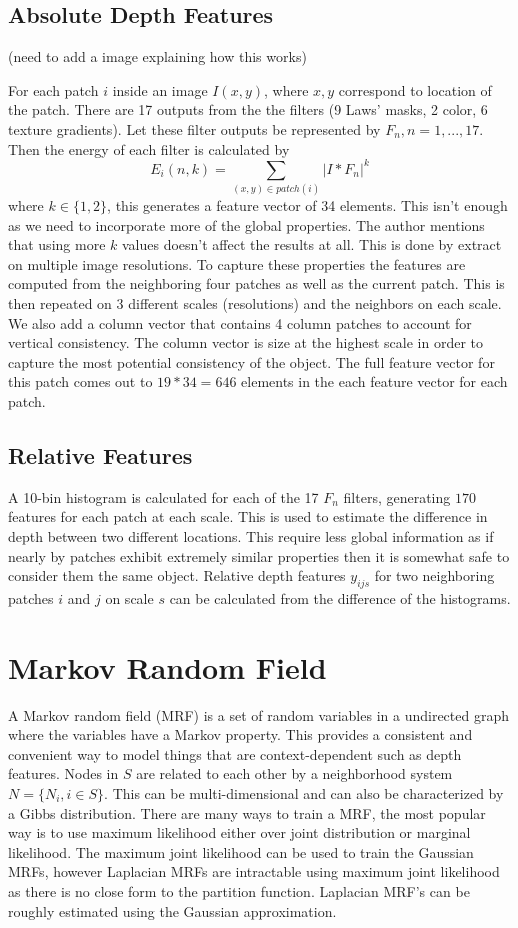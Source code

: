 \documentclass[journal]{IEEEtran}
\begin{document}
\subsection{Absolute Depth Features}
(need to add a image explaining how this works)

For each patch $i$ inside an image $I(x, y)$, where $x, y$ correspond to location of the patch. There are 17 outputs from the the filters (9 Laws' masks, 2 color, 6 texture gradients). Let these filter outputs be represented by $F_n, n = 1,..., 17$. Then the energy of each filter is calculated by
\begin{equation}
E_i(n, k) = \sum_{(x, y) \in patch(i)} |I * F_n|^k
\end{equation}
where $k \in \{1, 2\}$, this generates a feature vector of 34 elements.
This isn't enough as we need to incorporate more of the global properties. The author mentions that using more $k$ values doesn't affect the results at all. This is done by extract on multiple image resolutions. To capture these properties the features are computed from the neighboring four patches as well as the current patch. This is then repeated on 3 different scales (resolutions) and the neighbors on each scale. We also add a column vector that contains 4 column patches to account for vertical consistency. The column vector is size at the highest scale in order to capture the most potential consistency of the object. The full feature vector for this patch comes out to $19*34 = 646$ elements in the each feature vector for each patch.

\subsection{Relative Features}
A 10-bin histogram is calculated for each of the 17 $F_n$ filters, generating $170$ features for each patch at each scale. This is used to estimate the difference in depth between two different locations. This require less global information as if nearly by patches exhibit extremely similar properties then it is somewhat safe to consider them the same object. Relative depth features $y_{ijs}$ for two neighboring patches $i$ and $j$ on scale $s$ can be calculated from the difference of the histograms.

\section{Markov Random Field}
A Markov random field (MRF) is a set of random variables in a undirected graph where the variables have a Markov property. This provides a consistent and convenient way to model things that are context-dependent such as depth features. Nodes in $S$ are related to each other by a neighborhood system $N = \{N_i, i \in S\}$. This can be multi-dimensional and can also be characterized by a Gibbs distribution. There are many ways to train a MRF, the most popular way is to use maximum likelihood either over joint distribution or marginal likelihood.
The maximum joint likelihood can be used to train the Gaussian MRFs, however Laplacian MRFs are intractable using maximum joint likelihood as there is no close form to the partition function. Laplacian MRF's can be roughly estimated using the Gaussian approximation.
\end{document}
